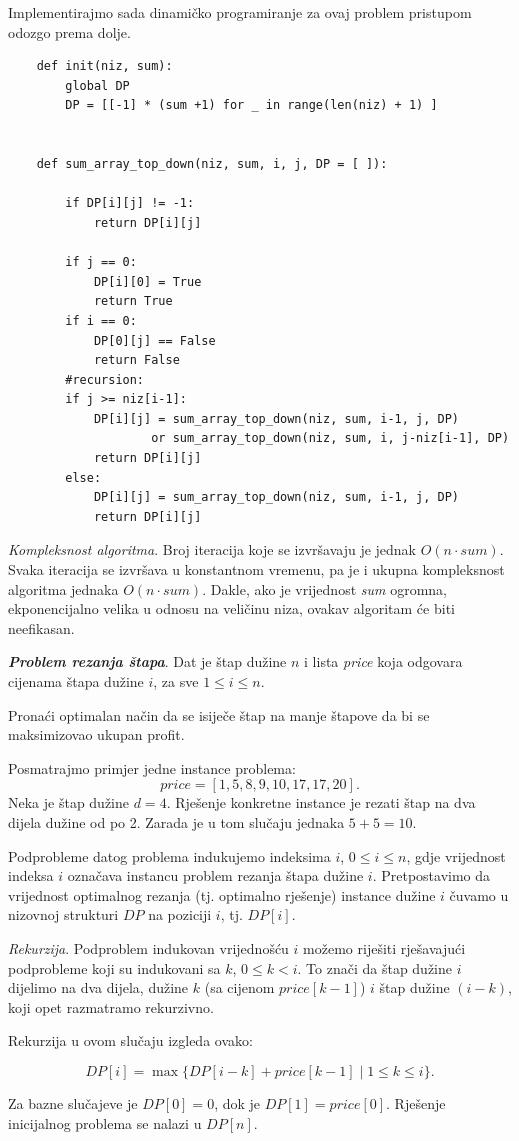 Implementirajmo sada dinamičko programiranje za ovaj problem pristupom odozgo prema dolje.

   \begin{verbatim}
	def init(niz, sum):
		global DP
		DP = [[-1] * (sum +1) for _ in range(len(niz) + 1) ]
	
	
	def sum_array_top_down(niz, sum, i, j, DP = [ ]):
	
		if DP[i][j] != -1:
			return DP[i][j]
	
		if j == 0:
			DP[i][0] = True
			return True 
		if i == 0: 
			DP[0][j] == False
			return False
		#recursion: 
		if j >= niz[i-1]:
			DP[i][j] = sum_array_top_down(niz, sum, i-1, j, DP) 
	                or sum_array_top_down(niz, sum, i, j-niz[i-1], DP)
			return DP[i][j]
		else:
			DP[i][j] = sum_array_top_down(niz, sum, i-1, j, DP)
			return DP[i][j]
\end{verbatim}  

\textit{Kompleksnost algoritma}. Broj iteracija koje se izvršavaju je jednak $O(n \cdot sum)$. Svaka iteracija se izvršava u konstantnom vremenu, pa je i ukupna kompleksnost algoritma jednaka  $O(n \cdot sum)$. Dakle, ako je vrijednost \emph{sum} ogromna, ekponencijalno velika u odnosu na veličinu niza, ovakav algoritam će biti neefikasan. 



\begin{example}
	\textbf{\textit{Problem rezanja štapa}}. Dat je štap dužine $n$ i lista \textit{price} koja odgovara cijenama štapa dužine $i$, za sve $1 \leq i \leq n$.
	
	Pronaći optimalan način da se isiječe  štap na manje
	štapove da bi se maksimizovao ukupan profit.
\end{example}


\begin{solution}
	Posmatrajmo primjer jedne instance problema: 
	$$ price = [1, 5, 8, 9, 10,
	17, 17, 20].$$  Neka je štap dužine $d=4$.
	Rješenje konkretne instance je rezati štap na dva dijela dužine od po 2. Zarada je u tom slučaju jednaka $5 + 5 = 10$. 
	
	 Podprobleme datog problema indukujemo indeksima $i$, $0 \leq i \leq n$, gdje vrijednost indeksa $i$ označava instancu problem rezanja štapa dužine $i$. Pretpostavimo da vrijednost optimalnog rezanja (tj. optimalno rješenje)  instance dužine $i$ čuvamo u nizovnoj strukturi $DP$ na poziciji $i$, tj. $DP[i]$.
	 
	 \textit{Rekurzija}. Podproblem indukovan vrijednošću $i$ možemo  riješiti rješavajući podprobleme koji su indukovani sa $k$, $0 \leq k < i$. To znači da štap dužine $i$ dijelimo na dva dijela, dužine $k$ (sa cijenom $price[k-1]$) $i$ štap dužine $(i-k)$, koji opet razmatramo rekurzivno.  
	 
	 Rekurzija u ovom slučaju izgleda ovako:
	 
	 $$ DP[i] = \max \{ DP[i-k] + price[k-1] \mid 1 \leq k \leq i\}.$$
	 
	 Za bazne slučajeve je $DP[0] = 0$, dok je $DP[1] = price[0]$.
	 Rješenje inicijalnog problema se nalazi u $DP[n]$.
\end{solution}

